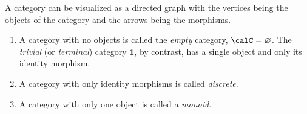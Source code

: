 A category can be visualized as a directed graph with the vertices
being the objects of the category and the arrows being the morphisms.
\begin{example}
\begin{enumerate}
    \item A category with no objects is called the \emph{empty} category, $\calC=\varnothing$. The \emph{trivial} (or \emph{terminal}) category $\mathbf{1}$, by contrast, has a single object and only its identity morphism.
    \item A category with only identity morphisms is called \emph{discrete}.
    \item A category with only one object is called a \emph{monoid}.
\end{enumerate}
    
\end{example}

